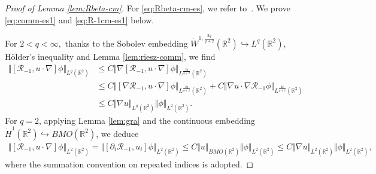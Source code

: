 \documentclass[reqno,11pt,a4paper]{amsart}
\begin{document}
\begin{proof}[Proof of Lemma \ref{lem:Rbeta-cm}] 
For \eqref{eq:Rbeta-cm-es},
we refer to~\cite[Lemma~2.6]{LXY25}.
We prove \eqref{eq:comm-es1}
and \eqref{eq:R-1cm-es1} below.

For $2<q<\infty,$ thanks to the Sobolev embedding 
$\dot{W}^{1,\frac{2q}{q+2}}(\mathbb{R}^2) \hookrightarrow L^q(\mathbb{R}^2)$, H\"older's inequality and Lemma \ref{lem:riesz-comm}, 
we find
\begin{align}
 \Vert [\mathcal{R}_{-1}, u\cdot\nabla]\phi\Vert _{L^q(\mathbb{R}^2)}
  &\leq C \Vert \nabla[\mathcal{R}_{-1}, u\cdot\nabla]\phi \Vert _{L^{\frac{2q}{q+2}}(\mathbb{R}^2)} \nonumber  \\
  &\leq C \Vert [\nabla\mathcal{R}_{-1}, u\cdot\nabla]\phi\Vert _{L^{\frac{2q}{q+2}}(\mathbb{R}^2)} 
  + C \Vert \nabla u\cdot\nabla\mathcal{R}_{-1}\phi \Vert _{L^{\frac{2q}{q+2}}(\mathbb{R}^2)} \nonumber  \\
  &\leq C \Vert \nabla u\Vert _{L^q(\mathbb{R}^2)}\Vert \phi\Vert _{L^2(\mathbb{R}^2)}.\nonumber
\end{align}
For $q=2$, applying Lemma \ref{lem:gra} and the continuous embedding 
$\dot{H}^1(\mathbb{R}^2)\hookrightarrow BMO(\mathbb{R}^2)$, we deduce
\begin{align*}
  \Vert [\mathcal{R}_{-1}, u\cdot\nabla]\phi\Vert _{L^2(\mathbb{R}^2)} 
  = \Vert [\partial_i\mathcal{R}_{-1}, u_i]\phi\Vert _{L^2(\mathbb{R}^2)} 
  \leq C \Vert u\Vert _{BMO(\mathbb{R}^2)}\Vert \phi\Vert _{L^2(\mathbb{R}^2)}  
  \leq C \Vert \nabla u\Vert _{L^2(\mathbb{R}^2)} \Vert \phi\Vert _{L^2(\mathbb{R}^2)},
\end{align*}
where the summation convention on repeated indices is adopted.


\end{proof}
\end{document}
